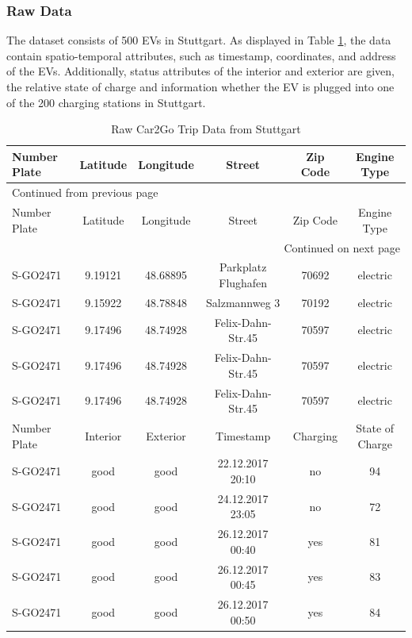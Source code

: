 \documentclass[a4paper, twoside, 12pt]{article}
\begin{document}
\subsubsection{Raw Data}
\label{sec:org2bfa92d}
The dataset consists of 500 EVs in Stuttgart. As displayed in Table
\ref{car2go-sample-data}, the data contain spatio-temporal attributes, such as
timestamp, coordinates, and address of the EVs. Additionally, status attributes
of the interior and exterior are given, the relative state of charge and
information whether the EV is plugged into one of the 200 charging stations in
Stuttgart.

\begin{longtable}{l|ccccc}
\caption{Raw Car2Go Trip Data from Stuttgart \label{car2go-sample-data}}
\\
\hline
\hline
Number Plate & Latitude & Longitude & Street & Zip Code & Engine Type\\
\hline
\endfirsthead
\multicolumn{6}{l}{Continued from previous page} \\
\hline

Number Plate & Latitude & Longitude & Street & Zip Code & Engine Type \\

\hline
\endhead
\hline\multicolumn{6}{r}{Continued on next page} \\
\endfoot
\endlastfoot
\hline
S-GO2471 & 9.19121 & 48.68895 & Parkplatz Flughafen & 70692 & electric\\
S-GO2471 & 9.15922 & 48.78848 & Salzmannweg 3 & 70192 & electric\\
S-GO2471 & 9.17496 & 48.74928 & Felix-Dahn-Str.45 & 70597 & electric\\
S-GO2471 & 9.17496 & 48.74928 & Felix-Dahn-Str.45 & 70597 & electric\\
S-GO2471 & 9.17496 & 48.74928 & Felix-Dahn-Str.45 & 70597 & electric\\
\hline
Number Plate & Interior & Exterior & Timestamp & Charging & State of Charge\\
\hline
S-GO2471 & good & good & 22.12.2017 20:10 & no & 94\\
S-GO2471 & good & good & 24.12.2017 23:05 & no & 72\\
S-GO2471 & good & good & 26.12.2017 00:40 & yes & 81\\
S-GO2471 & good & good & 26.12.2017 00:45 & yes & 83\\
S-GO2471 & good & good & 26.12.2017 00:50 & yes & 84\\
\hline
\hline
\end{longtable}
\end{document}

